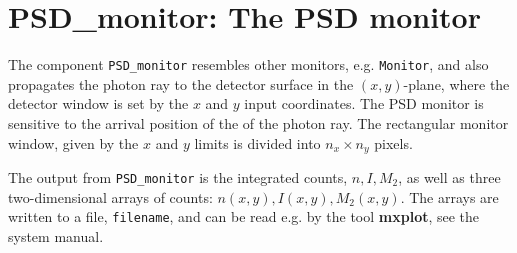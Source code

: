 \section{PSD\_monitor: The PSD monitor}

The component \texttt{PSD\_monitor} resembles other monitors, e.g.
\texttt{Monitor}, and also propagates the photon ray to the detector
surface in the $(x,y)$-plane, where the detector window is set
by the $x$ and $y$ input coordinates.
The PSD monitor is sensitive to the arrival position of the of the photon ray.
The rectangular monitor window, given by the $x$ and $y$
limits is divided into $n_x \times n_y$ pixels.

The output from \texttt{PSD\_monitor} is the integrated counts, $n, I, M_2$,
as well as
three two-dimensional arrays of counts: $n(x,y), I(x,y), M_2(x,y)$.
The arrays are written to a file, \verb+filename+, and can be read e.g. by the tool
\textbf{mxplot}, see the system manual.
